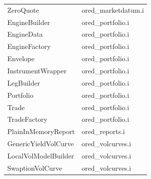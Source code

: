 \documentclass[12pt, a4paper]{report}
\begin{document}
\begin{appendix}
{\begin{longtable}{|l|l|}
ZeroQuote & ored\_marketdatum.i \\
EngineBuilder & ored\_portfolio.i \\
EngineData & ored\_portfolio.i \\
EngineFactory & ored\_portfolio.i \\
Envelope & ored\_portfolio.i \\
InstrumentWrapper & ored\_portfolio.i \\
LegBuilder & ored\_portfolio.i \\
Portfolio & ored\_portfolio.i \\
Trade & ored\_portfolio.i \\
TradeFactory & ored\_portfolio.i \\
PlainInMemoryReport & ored\_reports.i \\
GenericYieldVolCurve & ored\_volcurves.i \\
LocalVolModelBuilder & ored\_volcurves.i \\
SwaptionVolCurve & ored\_volcurves.i \\
\hline
\end{longtable}
}


\end{appendix}
\end{document}
